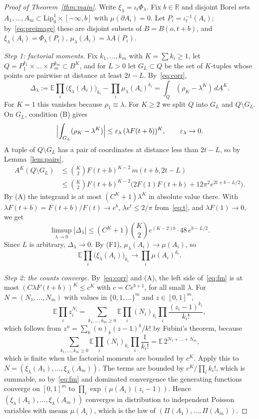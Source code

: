 \documentclass[11pt]{amsart}
\theoremstyle{definition}
\theoremstyle{remark}
\newcommand{\R}{\mathbb{R}}
\newcommand{\E}{\mathbb{E}}
\newcommand{\Lip}{\mathrm{Lip}}
\newcommand{\area}{A}
\begin{document}
\begin{proof}[Proof of Theorem~\ref{thm:main}]
Write $\xi_\lambda=\iota_{t}\Phi_\lambda$. Fix $b\in\R$ and disjoint Borel sets $A_1,\dots,A_m\subset
\Lip^1_0\times[-\infty,b]$ with $\mu(\partial A_i)=0$. Let $P_i=\iota_t^{-1}(A_i)$; by~\eqref{eq:preimage} these are
disjoint subsets of $B=B(o,t+b)$, and $\xi_\lambda(A_i)=\Phi_\lambda(P_i)$, $\mu_\lambda(A_i)=\lambda\area(P_i)$.

\emph{Step 1: factorial moments.} Fix $k_1,\dots,k_m$ with $K=\sum k_i\ge1$, let $Q=P_1^{k_1}\times\dots\times
P_m^{k_m}\subset B^K$, and for $L>0$ let $G_L\subset Q$ be the set of $K$-tuples whose points are pairwise at distance at
least $2t-L$. By~\eqref{eq:corr},
\[
  \Delta_\lambda:=\E\prod_i\bigl(\xi_\lambda(A_i)\bigr)_{k_i}-\prod_i\mu_\lambda(A_i)^{k_i}=\int_Q(\rho_K-\lambda^K)\,d\area^K.
\]
For $K=1$ this vanishes because $\rho_1\equiv\lambda$. For $K\ge2$ we split $Q$ into $G_L$ and $Q\setminus G_L$. On $G_L$,
condition (B) gives
\[
  \Bigl|\int_{G_L}(\rho_K-\lambda^K)\Bigr|\le\varepsilon_\lambda\,(\lambda F(t+b))^K,\qquad\varepsilon_\lambda\to0.
\]
A tuple of $Q\setminus G_L$ has a pair of coordinates at distance less than $2t-L$, so by Lemma~\ref{lem:pairs},
\begin{align*}
  \area^K(Q\setminus G_L)&\le\binom K2F(t+b)^{K-2}\,m(t+b,2t-L)\\
  &\le\binom K2F(t+b)^{K-2}\bigl(2F(1)F(t+b)+12\pi^2e^{2t+b-L/2}\bigr).
\end{align*}
By (A) the integrand is at most $(C^K+1)\lambda^K$ in absolute value there. With $\lambda F(t+b)=F(t+b)/F(t)\to e^b$,
$\lambda e^t\le2/\pi$ from~\eqref{eq:t}, and $\lambda F(1)\to0$, we get
\[
  \limsup_{\lambda\to0}|\Delta_\lambda|\le(C^K+1)\binom K2e^{(K-2)b}\cdot48\,e^{b-L/2}.
\]
Since $L$ is arbitrary, $\Delta_\lambda\to0$. By (F1), $\mu_\lambda(A_i)\to\mu(A_i)$, so
\begin{equation}\label{eq:fm}
  \E\prod_i\bigl(\xi_\lambda(A_i)\bigr)_{k_i}\longrightarrow\prod_i\mu(A_i)^{k_i}.
\end{equation}

\emph{Step 2: the counts converge.} By~\eqref{eq:corr} and (A), the left side of~\eqref{eq:fm} is at most
$(C\lambda F(t+b))^K\le c^K$ with $c=Ce^{b+1}$, for all small $\lambda$. For $N=(N_1,\dots,N_m)$ with values in
$\{0,1,\dots\}^m$ and $z\in[0,1]^m$,
\[
  \E\prod_iz_i^{N_i}=\sum_{k_1,\dots,k_m\ge0}\E\prod_i(N_i)_{k_i}\prod_i\frac{(z_i-1)^{k_i}}{k_i!},
\]
which follows from $z^n=\sum_k(n)_k(z-1)^k/k!$ by Fubini's theorem, because
\[
  \sum_{k_1,\dots,k_m\ge0}\E\prod_i(N_i)_{k_i}\prod_i\frac1{k_i!}=\E\,2^{N_1+\dots+N_m},
\]
which is finite when the factorial moments are bounded by $c^K$. Apply this to $N=(\xi_\lambda(A_1),\dots,\xi_\lambda(A_m))$. The terms are bounded by $c^K/\prod_ik_i!$, which is
summable, so by~\eqref{eq:fm} and dominated convergence the generating functions converge on $[0,1]^m$ to
$\prod_i\exp(\mu(A_i)(z_i-1))$. Hence $(\xi_\lambda(A_1),\dots,\xi_\lambda(A_m))$ converges in distribution to
independent Poisson variables with means $\mu(A_i)$, which is the law of $(\Pi(A_1),\dots,\Pi(A_m))$.


\end{proof}
\end{document}

